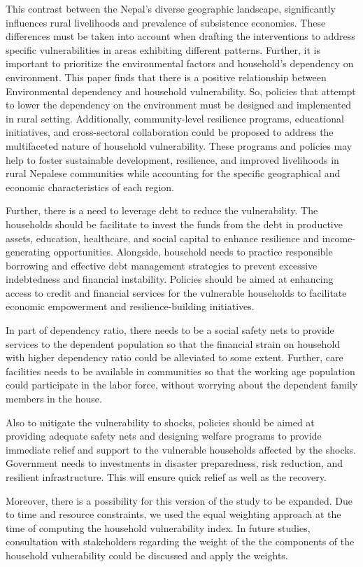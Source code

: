 This contrast between the Nepal's diverse geographic landscape, significantly influences rural livelihoods and prevalence of subsistence economies. These differences must be taken into account when drafting the interventions to address specific vulnerabilities in areas exhibiting different patterns. Further, it is important to prioritize the environmental factors and household's dependency on environment. This paper finds that there is a positive relationship between Environmental dependency and household vulnerability. So, policies that attempt to lower the dependency on the environment must be designed and implemented in rural setting. Additionally, community-level resilience programs, educational initiatives, and cross-sectoral collaboration could be proposed to address the multifaceted nature of household vulnerability.  These programs and policies may help to foster sustainable development, resilience, and improved livelihoods in rural Nepalese communities while accounting for the specific geographical and economic characteristics of each region. 

Further, there is a need to leverage debt to reduce the vulnerability. The households should be facilitate to invest the funds from the debt in productive assets, education, healthcare, and social capital to enhance resilience and income-generating opportunities. Alongside, household needs to practice responsible borrowing and effective debt management strategies to prevent excessive indebtedness and financial instability. Policies should be aimed at enhancing access to credit and financial services for the vulnerable households to facilitate economic empowerment and resilience-building initiatives.

In part of dependency ratio, there needs to be a social safety nets to provide services to the dependent population so that the financial strain on household with higher dependency ratio could be alleviated to some extent. Further, care facilities needs to be available in communities so that the working age population could participate in the labor force, without worrying about the dependent family members in the house. 

Also to mitigate the vulnerability to shocks, policies should be aimed at providing adequate safety nets and designing welfare programs to provide immediate relief and support to the vulnerable households affected by the shocks. Government needs to investments in disaster preparedness, risk reduction, and resilient infrastructure. This will ensure quick relief as well as the recovery.   

Moreover, there is a possibility for this version of the study to be expanded. Due to time and resource constraints, we used the equal weighting approach at the time of computing the household vulnerability index. In future studies, consultation with stakeholders regarding the weight of the the components of the household vulnerability could be discussed and apply the weights.





 
